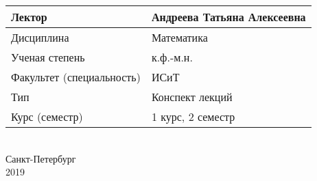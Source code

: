 \documentclass{article}
\numberwithin{equation}{section}
\begin{document}
\pagestyle{empty}
\vspace*{9cm}
\begin{center}
\begin{tabular}{|l|l|}
\hline
Лектор & Андреева Татьяна Алексеевна \\ \hline
Дисциплина & Математика \\ \hline
Ученая степень & к.ф.-м.н. \\ \hline
Факультет (специальность) & ИСиТ \\ \hline
Тип & Конспект лекций \\ \hline
Курс (семестр) & 1 курс, 2 семестр \\ \hline
\end{tabular}\\
\vspace*{9cm}
Санкт-Петербург\\
2019
\end{center}
\newpage
\pagestyle{fancy}
\end{document}

